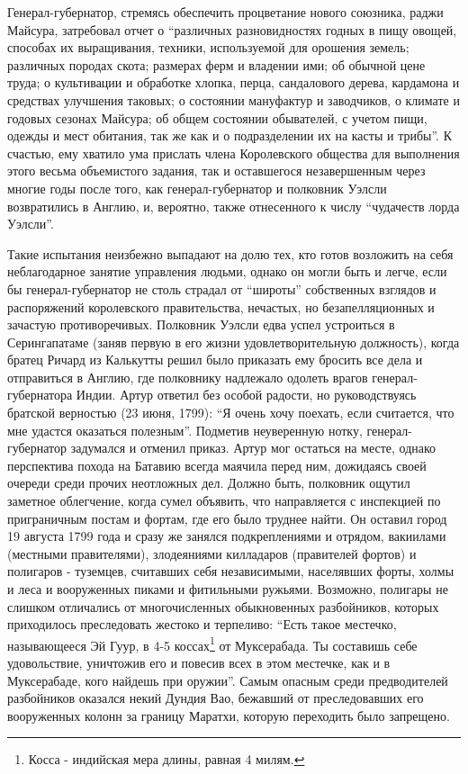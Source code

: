 \documentclass[
  oneside,
  12pt,
  titlepage]{book}
\begin{document}
Генерал-губернатор, стремясь обеспечить процветание нового союзника, раджи Майсура, затребовал отчет о ``различных разновидностях годных в пищу овощей, способах их выращивания, техники, используемой для орошения земель; различных породах скота; размерах ферм и владении ими; об обычной цене труда; о культивации и обработке хлопка, перца, сандалового дерева, кардамона и средствах улучшения таковых; о состоянии мануфактур и заводчиков, о климате и годовых сезонах Майсура; об общем состоянии обывателей, с учетом пищи, одежды и мест обитания, так же как и о подразделении их на касты и трибы''. К счастью, ему хватило ума прислать члена Королевского общества для выполнения этого весьма объемистого задания, так и оставшегося незавершенным через многие годы после того, как генерал-губернатор и полковник Уэлсли возвратились в Англию, и, вероятно, также отнесенного к числу ``чудачеств лорда Уэлсли''.

Такие испытания неизбежно выпадают на долю тех, кто готов возложить на себя неблагодарное занятие управления людьми, однако он могли быть и легче, если бы генерал-губернатор не столь страдал от ``широты'' собственных взглядов и распоряжений королевского правительства, нечастых, но безапелляционных и зачастую противоречивых. Полковник Уэлсли едва успел устроиться в Серингапатаме (заняв первую в его жизни удовлетворительную должность), когда братец Ричард из Калькутты решил было приказать ему бросить все дела и отправиться в Англию, где полковнику надлежало одолеть врагов генерал-губернатора Индии. Артур ответил без особой радости, но руководствуясь братской верностью (23 июня, 1799): ``Я очень хочу поехать, если считается, что мне удастся оказаться полезным''. Подметив неуверенную нотку, генерал-губернатор задумался и отменил приказ. Артур мог остаться на месте, однако перспектива похода на Батавию всегда маячила перед ним, дожидаясь своей очереди среди прочих неотложных дел. Должно быть, полковник ощутил заметное облегчение, когда сумел объявить, что направляется с инспекцией по приграничным постам и фортам, где его было труднее найти. Он оставил город 19 августа 1799 года и сразу же занялся подкреплениями и отрядом, вакиилами (местными правителями), злодеяниями килладаров (правителей фортов) и полигаров - туземцев, считавших себя независимыми, населявших форты, холмы и леса и вооруженных пиками и фитильными ружьями. Возможно, полигары не слишком отличались от многочисленных обыкновенных разбойников, которых приходилось преследовать жестоко и терпеливо: ``Есть такое местечко, называющееся Эй Гуур, в 4-5 коссах\footnote{Косса - индийская мера длины, равная 4 милям.} от Муксерабада. Ты составишь себе удовольствие, уничтожив его и повесив всех в этом местечке, как и в Муксерабаде, кого найдешь при оружии''. Самым опасным среди предводителей разбойников оказался некий Дундия Вао, бежавший от преследовавших его вооруженных колонн за границу Маратхи, которую переходить было запрещено.
\end{document}
